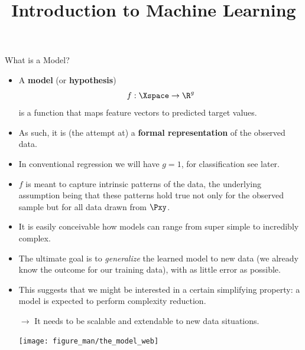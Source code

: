 \documentclass[11pt,compress,t,notes=noshow, xcolor=table]{beamer}
\title{Introduction to Machine Learning}
\institute{\href{https://compstat-lmu.github.io/lecture_i2ml/}{compstat-lmu.github.io/lecture\_i2ml}}
\date{}
\begin{document}









\begin{vbframe}{What is a Model?}

\begin{itemize}

  \item A \textbf{model} (or \textbf{hypothesis}) 
  $$f : \Xspace \rightarrow \R^g$$ 
  is a function that maps feature vectors to predicted target values.
  
  \item As such, it is (the attempt at) a \textbf{formal representation} of the 
  observed data.
  
  \item In conventional regression we will have $g = 1$, for classification
  see later.
  
  \item $f$ is meant to capture intrinsic patterns of the data, the
  underlying assumption being that these patterns hold true not only for the
  observed sample but for all data drawn from $\Pxy$.
  
  \framebreak
  
  \item It is easily conceivable how models can range from super simple to
  incredibly complex.
  
  \item The ultimate goal is to \emph{generalize} the learned model to new
  data (we already know the outcome for our training data), with as little
  error as possible.
  
  \item This suggests that we might be interested in a certain
  simplifying property: a model is expected to perform complexity reduction.
  
  $\rightarrow$ It needs to be scalable and extendable to new data situations.

  \begin{center}
    \texttt{[image: figure\_man/the\_model\_web]} 
  \end{center}

\end{itemize}

\end{vbframe}
\end{document}
